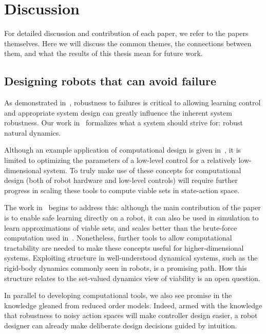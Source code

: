 
\chapter{Discussion}

For detailed discussion and contribution of each paper, we refer to the papers themselves. Here we will discuss the common themes, the connections between them, and what the results of this thesis mean for future work.

\section{Designing robots that can avoid failure}

As demonstrated in~\cite{heim2018shaping}, robustness to failures is critical to allowing learning control and appropriate system design can greatly influence the inherent system robustness. Our work in~\cite{heim2019beyond} formalizes what a system should strive for: robust natural dynamics. \par
Although an example application of computational design is given in~\cite{heim2019beyond}, it is limited to optimizing the parameters of a low-level control for a relatively low-dimensional system. To truly make use of these concepts for computational design (both of robot hardware and low-level controls) will require further progress in scaling these tools to compute viable sets in state-action space. \par
The work in~\cite{heim2019learnable} begins to address this: although the main contribution of the paper is to enable safe learning directly on a robot, it can also be used in simulation to learn approximations of viable sets, and scales better than the brute-force computation used in~\cite{heim2019beyond}.
Nonetheless, further tools to allow computational tractability are needed to make these concepts useful for higher-dimensional systems. Exploiting structure in well-understood dynamical systems, such as the rigid-body dynamics commonly seen in robots, is a promising path. How this structure relates to the set-valued dynamics view of viability is an open question. \par
In parallel to developing computational tools, we also see promise in the knowledge gleaned from reduced order models. Indeed, armed with the knowledge that robustness to noisy action spaces will make controller design easier, a robot designer can already make deliberate design decisions guided by intuition.


